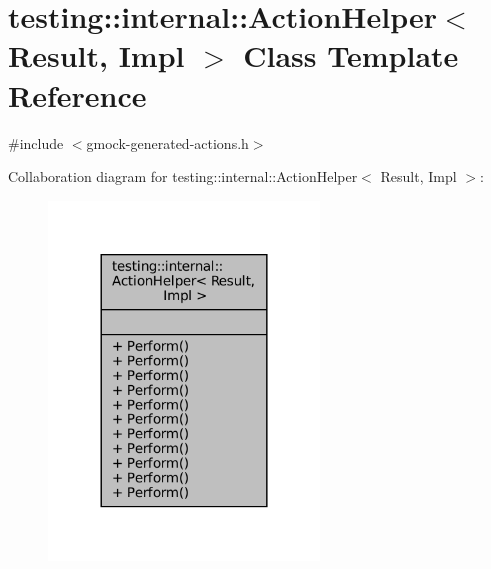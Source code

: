 \hypertarget{classtesting_1_1internal_1_1ActionHelper}{}\section{testing\+:\+:internal\+:\+:Action\+Helper$<$ Result, Impl $>$ Class Template Reference}
\label{classtesting_1_1internal_1_1ActionHelper}


{\ttfamily \#include $<$gmock-\/generated-\/actions.\+h$>$}



Collaboration diagram for testing\+:\+:internal\+:\+:Action\+Helper$<$ Result, Impl $>$\+:
\nopagebreak
\begin{figure}[H]
\begin{center}
\leavevmode
\includegraphics[width=204pt]{classtesting_1_1internal_1_1ActionHelper__coll__graph}
\end{center}
\end{figure}
